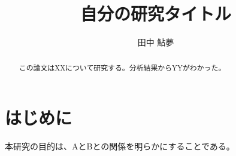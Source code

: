 \documentclass[dvipdfmx]{article}
\title{自分の研究タイトル}
\author{田中 鮎夢}
\begin{document}
\maketitle

\begin{abstract}
この論文はXXについて研究する。分析結果からYYがわかった。
\end{abstract}

\section{はじめに}

本研究の目的は、AとBとの関係を明らかにすることである。




\end{document}
